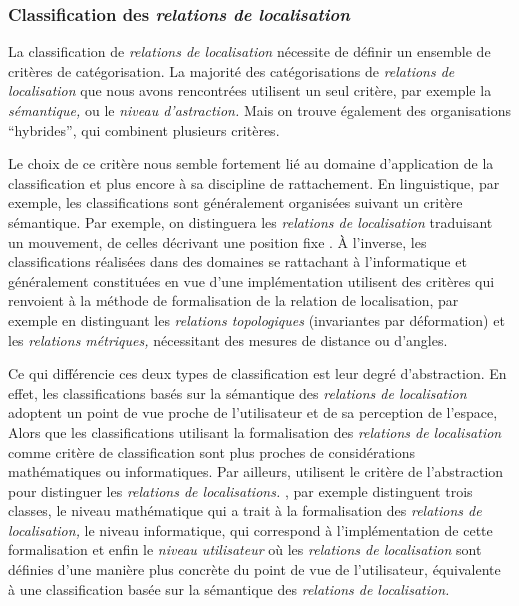 \subsubsection{Classification des \emph{relations de localisation}}

La classification de \emph{relations de localisation} nécessite de
définir un ensemble de critères de catégorisation. La majorité des
catégorisations de \emph{relations de localisation} que nous avons
rencontrées utilisent un seul critère, par exemple la
\emph{sémantique,} ou le\emph{ niveau d'astraction.} Mais on trouve
également des organisations \enquote{hybrides}, qui combinent
plusieurs critères.

Le choix de ce critère nous semble fortement lié au domaine
d’application de la classification et plus encore à sa discipline de
rattachement. En linguistique, par exemple, les classifications sont
généralement organisées suivant un critère sémantique. Par exemple, on
distinguera les \emph{relations de localisation} traduisant un
mouvement, de celles décrivant une position fixe
\autocite{Borillo1998}. À l'inverse, les classifications réalisées
dans des domaines se rattachant à l'informatique et généralement
constituées en vue d'une implémentation utilisent des critères qui
renvoient à la méthode de formalisation de la relation de
localisation, par exemple en distinguant les \emph{relations
  topologiques} (\ie invariantes par déformation) et les
\emph{relations métriques,} nécessitant des mesures de distance ou
d'angles.

Ce qui différencie ces deux types de classification est leur degré
d'abstraction. En effet, les classifications basés sur la sémantique
des \emph{relations de localisation} adoptent un point de vue proche
de l'utilisateur et de sa perception de l'espace, Alors que les
classifications utilisant la formalisation des \emph{relations de
  localisation} comme critère de classification sont plus proches de
considérations mathématiques ou informatiques. Par ailleurs,
\textcite{Clementini2008a,Bucher2012} utilisent le critère de
l’abstraction pour distinguer les \emph{relations de localisations.}
\textcite{Clementini2008a}, par exemple distinguent trois classes, le
niveau mathématique qui a trait à la formalisation des \emph{relations
  de localisation,} le niveau informatique, qui correspond à
l'implémentation de cette formalisation et enfin le \emph{niveau
  utilisateur} où les \emph{relations de localisation} sont définies
d'une manière plus concrète du point de vue de l'utilisateur, \ie
équivalente à une classification basée sur la sémantique des
\emph{relations de localisation.}


